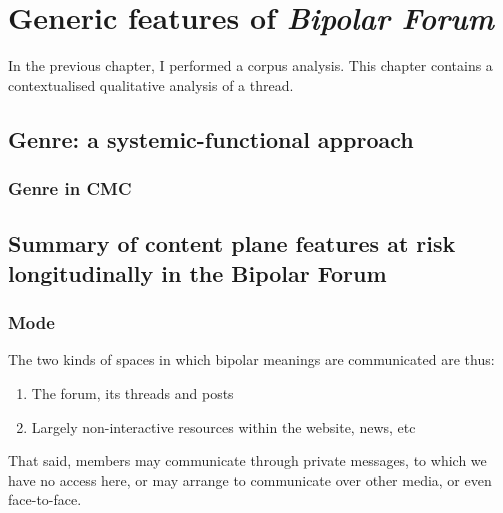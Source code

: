 
\chapter{Generic features of \emph{Bipolar Forum}}

In the previous chapter, I performed a corpus analysis. This chapter contains a contextualised qualitative analysis of a thread.

\section{Genre: a systemic-functional approach}

	\subsection{Genre in CMC}



\section{Summary of content plane features at risk longitudinally in the Bipolar Forum}

\subsection{Mode} %

The two kinds of spaces in which bipolar meanings are communicated are thus:

\begin{enumerate}
    \item The forum, its threads and posts %
    \item Largely non-interactive resources within the website, news, etc %
\end{enumerate}

        \begin{table}[htb]
         \centering
        \caption{Main types of communication, their medium and turn facets}
        \label{tab:types}
        \end{table}
%
That said, members may communicate through private messages, to which we have no access here, or may arrange to communicate over other media, or even face-to-face.

